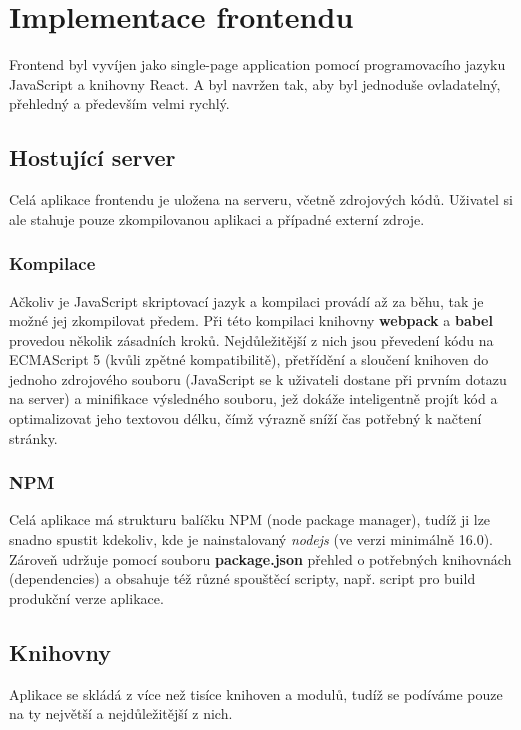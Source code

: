 \chapter{Implementace frontendu}
Frontend byl vyvíjen jako single-page application pomocí programovacího jazyku JavaScript a knihovny React.
A byl navržen tak, aby byl jednoduše ovladatelný, přehledný a především velmi rychlý.

\section{Hostující server}
Celá aplikace frontendu je uložena na serveru, včetně zdrojových kódů.
Uživatel si ale stahuje pouze zkompilovanou aplikaci a případné externí zdroje.
\subsection{Kompilace}
Ačkoliv je JavaScript skriptovací jazyk a kompilaci provádí až za běhu, tak je možné
jej zkompilovat předem. Při této kompilaci knihovny \textbf{webpack} a
\textbf{babel} provedou několik zásadních kroků. Nejdůležitější z nich jsou
převedení kódu na ECMAScript 5 (kvůli zpětné kompatibilitě), přetřídění a sloučení
knihoven do jednoho zdrojového souboru (JavaScript se k uživateli dostane při prvním dotazu na server) a
minifikace výsledného souboru, jež dokáže inteligentně projít kód a optimalizovat jeho textovou délku,
čímž výrazně sníží čas potřebný k načtení stránky.

\subsection{NPM}
Celá aplikace má strukturu balíčku NPM (node package manager), tudíž ji lze snadno
spustit kdekoliv, kde je nainstalovaný \textit{nodejs} (ve verzi minimálně 16.0).
Zároveň udržuje pomocí souboru \textbf{package.json} přehled o potřebných knihovnách (dependencies) a
obsahuje též různé spouštěcí scripty, např. script pro build produkční verze aplikace.

\section{Knihovny}
Aplikace se skládá z více než tisíce knihoven a modulů, tudíž se podíváme
pouze na ty největší a nejdůležitější z nich.

